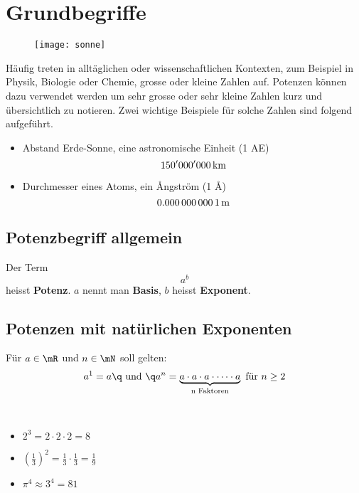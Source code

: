 \documentclass[
twoside,%
ngerman,%
headsepline%
11pt]%
{article}
\begin{document}
\pagestyle{myheadings}

\setcounter{page}{1}

\section{Grundbegriffe}
\begin{wrapfigure}{r}{0.318\textwidth}
  \begin{center}
    \texttt{[image: sonne]}
  \end{center}
\end{wrapfigure}
H\"aufig treten in allt\"aglichen oder wissenschaftlichen Kontexten, zum Beispiel in Physik, Biologie oder Chemie, grosse oder kleine Zahlen auf. Potenzen k\"onnen dazu verwendet werden um sehr grosse oder sehr kleine Zahlen kurz und \"ubersichtlich zu notieren. Zwei wichtige Beispiele f\"ur solche Zahlen sind folgend aufgef\"uhrt.

\begin{itemize}
\item Abstand Erde-Sonne, eine astronomische Einheit (1 AE)
$$\unit[150'000'000]{km}$$
\item Durchmesser eines Atoms, ein \AA ngstr\"om (1 \AA)
$$\unit[0.000\,000\,000\,1]{m}$$
\end{itemize}

\subsection{Potenzbegriff allgemein}
\begin{defn}
Der Term
$$a^b$$
heisst {\bf Potenz}. $a$ nennt man {\bf Basis}, $b$ heisst {\bf Exponent}.
\end{defn}

\subsection{Potenzen mit nat\"urlichen Exponenten}
\begin{defn}
F\"ur $a\in\mR$ und $n\in\mN$ soll gelten:
$$a^1=a\q\text{ und }\q a^n=\underbrace{a\cdot a\cdot a\cdot\dots\cdot a}_{\text{n Faktoren}}\text{ f\"ur }n\geq2$$
\end{defn}

\begin{bsps}
\ \\[-2ex]
\begin{itemize}
\item $2^3=2\cdot2\cdot2=8$
\item $\left(\frac{1}{3}\right)^2=\frac{1}{3}\cdot\frac{1}{3}=\frac{1}{9}$
\item $\pi^4\approx 3^4=81$
\end{itemize}
\end{bsps}
\end{document}

